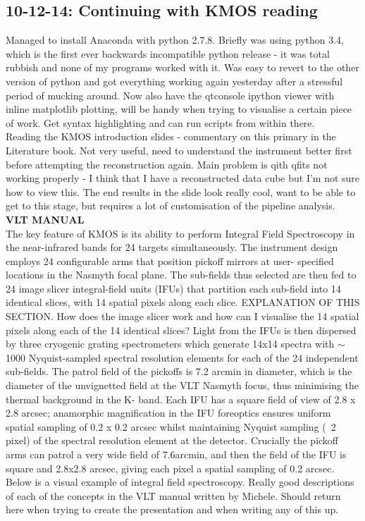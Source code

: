 \documentclass{literature}
\begin{document}
\subsection{10-12-14: Continuing with KMOS reading}
Managed to install Anaconda with python 2.7.8. Briefly was using python 3.4, which is the first ever backwards incompatible python release - it was total rubbish and none of my programs worked with it. Was easy to revert to the other version of python and got everything working again yesterday after a stressful period of mucking around. Now also have the qtconsole ipython viewer with inline matplotlib plotting, will be handy when trying to visualise a certain piece of work. Get syntax highlighting and can run scripts from within there. \\ 
Reading the KMOS introduction slides - commentary on this primary in the Literature book. Not very useful, need to understand the instrument better first before attempting the reconstruction again. Main problem is qith qfits not working properly - I think that I have a reconstructed data cube but I'm not sure how to view this. The end results in the slide look really cool, want to be able to get to this stage, but requires a lot of customisation of the pipeline analysis. \\ 
\textbf{VLT MANUAL} \\ 
The key feature of KMOS is its ability to perform Integral Field Spectroscopy in the near-infrared bands for 24 targets simultaneously. The instrument design employs 24 configurable arms that position pickoff mirrors at user- specified locations in the Nasmyth focal plane. The sub-fields thus selected are then fed to 24 image slicer integral-field units (IFUs) that partition each sub-field into 14 identical slices, with 14 spatial pixels along each slice. EXPLANATION OF THIS SECTION. How does the image slicer work and how can I visualise the 14 spatial pixels along each of the 14 identical slices? Light from the IFUs is then dispersed by three cryogenic grating spectrometers which generate 14x14 spectra with $\sim$1000 Nyquist-sampled spectral resolution elements for each of the 24 independent sub-fields. The patrol field of the pickoffs is 7.2 arcmin in diameter, which is the diameter of the unvignetted field at the VLT Nasmyth focus, thus minimising the thermal background in the K- band. Each IFU has a square field of view of 2.8 x 2.8 arcsec; anamorphic magnification in the IFU foreoptics ensures uniform spatial sampling of 0.2 x 0.2 arcsec whilst maintaining Nyquist sampling (~2 pixel) of the spectral resolution element at the detector. Crucially the pickoff arms can patrol a very wide field of 7.6arcmin, and then the field of the IFU is square and 2.8x2.8 arcsec, giving each pixel a spatial sampling of 0.2 arcsec. Below is a visual example of integral field spectroscopy. Really good descriptions of each of the concepts in the VLT manual written by Michele. Should return here when trying to create the presentation and when writing any of this up. 
\end{document}
